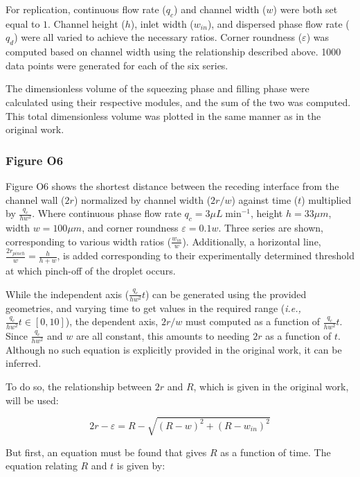 For replication, continuous flow rate ($q_c$) and channel width ($w$) were both set equal to $1$.
Channel height ($h$), inlet width ($w_{in}$), and dispersed phase flow rate ($q_d$) were all varied to
achieve the necessary ratios. Corner roundness ($\varepsilon$) was computed based on channel width using the
relationship described above. 1000 data points were generated for each of the six series.

The dimensionless volume of the squeezing phase and filling phase were calculated using their
respective modules, and the sum of the two was computed. This total dimensionless volume was plotted
in the same manner as in the original work.

\subsubsection{Figure O6}

Figure O6 shows the shortest distance between the receding interface from the channel wall ($2r$) normalized
by channel width ($2r/w$) against time ($t$) multiplied by $\frac{q_c}{hw^2}$. Where continuous phase
flow rate $q_c = 3{\mu}L\;\mathrm{min}^{-1}$, height $h=33{\mu}m$, width $w=100{\mu}m$, and corner roundness
$\varepsilon=0.1w$. Three series are shown, corresponding to various width ratios ($\frac{w_{in}}{w}$).
Additionally, a horizontal line, $\frac{2r_{pinch}}{w}=\frac{h}{h+w}$, is added corresponding to
their experimentally determined threshold at which pinch-off of the droplet occurs.

While the independent axis ($\frac{q_c}{hw^2}t$) can be generated using the provided geometries, and varying
time to get values in the required range (\emph{i.e.,} $\frac{q_c}{hw^2}t \in [0,10]$), the dependent axis,
$2r/w$ must computed as a function of $\frac{q_c}{hw^2}t$. Since $\frac{q_c}{hw^2}$ and $w$ are all constant,
this amounts to needing $2r$ as a function of $t$. Although no such equation
is explicitly provided in the original work, it can be inferred.

To do so, the relationship between $2r$ and $R$, which is given in the original work, will be used:

\begin{equation}
  2r - \varepsilon = R - \sqrt{\left(R - w\right)^2 + \left(R - w_{in}\right)^2}
\end{equation}

\noindent But first, an equation must be found that gives $R$ as a function of time. The equation
relating $R$ and $t$ is given by:

